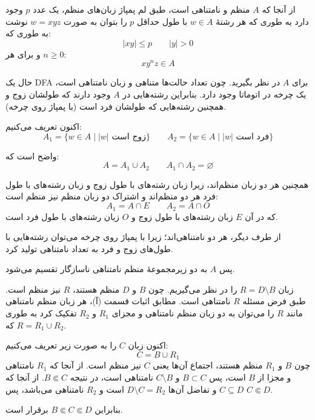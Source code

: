 

از آنجا که \(A\) منظم و نامتناهی است، طبق لم پمپاژ زبان‌های منظم، یک عدد \(p\) وجود دارد به طوری که هر رشتهٔ \(w \in A\) با طول حداقل \(p\) را بتوان به صورت
\(
w=xyz
\)
نوشت به طوری که:
\[
|xy|\le p\qquad |y|>0
\]
و برای هر \(n\ge0\):
\[
xy^nz \in A
\]

حال یک DFA برای \(A\) در نظر بگیرید. چون تعداد حالت‌ها متناهی و زبان نامتناهی است، یک چرخه در اتوماتا وجود دارد. بنابراین رشته‌هایی در \(A\) وجود دارند که طولشان زوج و همچنین رشته‌هایی که طولشان فرد است (با پمپاژ روی چرخه).

اکنون تعریف می‌کنیم:
\[
A_1=\{w\in A \mid |w| \text{ زوج است}\} \qquad A_2=\{w\in A \mid |w| \text{ فرد است}\}
\]

واضح است که:
\[
A=A_1\cup A_2
\qquad
A_1\cap A_2=\varnothing
\]

همچنین هر دو زبان منظم‌اند، زیرا زبان رشته‌های با طول زوج و زبان رشته‌های با طول فرد هر دو منظم‌اند و اشتراک دو زبان منظم نیز منظم است:
\[
A_1=A\cap E\qquad A_2=A\cap O
\]
که در آن \(E\) زبان رشته‌های با طول زوج و \(O\) زبان رشته‌های با طول فرد است.

از طرف دیگر، هر دو نامتناهی‌اند؛ زیرا با پمپاژ روی چرخه می‌توان رشته‌هایی با طول‌های زوج و فرد به تعداد نامتناهی تولید کرد.

پس \(A\) به دو زیرمجموعهٔ منظم نامتناهی ناسازگار تقسیم می‌شود.



زبان $R = D \setminus B$ را در نظر می‌گیریم. چون $B$ و $D$ منظم هستند، $R$ نیز منظم است. طبق فرض مسئله $R$ نامتناهی است. 
مطابق اثبات قسمت (آ)، هر زبان منظم نامتناهی مانند $R$ را می‌توان به دو زبان منظم نامتناهی و مجزای $R_1$ و $R_2$ تفکیک کرد به طوری که $R = R_1 \cup R_2$.

اکنون زبان $C$ را به صورت زیر تعریف می‌کنیم:
\[ C = B \cup R_1 \]
چون $B$ و $R_1$ منظم هستند، اجتماع آن‌ها یعنی $C$ نیز منظم است.
از آنجا که $R_1$ نامتناهی و مجزا از $B$ است، پس $B \subset C$ و $C \setminus B$ نامتناهی است، در نتیجه $B \Subset C$.
از آنجا که $C \subseteq D$ و تفاضل آن‌ها $D \setminus C = R_2$ است و $R_2$ نامتناهی می‌باشد، پس $C \Subset D$.

بنابراین $B \Subset C \Subset D$ برقرار است.